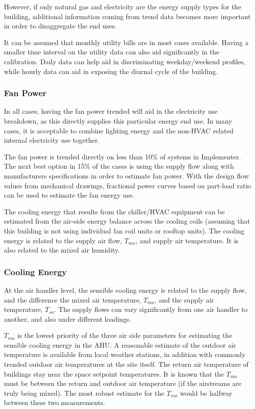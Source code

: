 However, if only natural gas and electricity are the energy supply types for the building, additional information coming from trend data becomes more important in order to disaggregate the end uses. 

It can be assumed that monthly utility bills are in most cases available. Having a smaller time interval on the utility data can also aid significantly in the calibration. Daily data can help aid in discriminating weekday/weekend profiles, while hourly data can aid in exposing the diurnal cycle of the building. 

\subsubsection{Fan Power}

In all cases, having the fan power trended will aid in the electricity use breakdown, as this directly supplies this particular energy end use. In many cases, it is acceptable to combine lighting energy and the non-HVAC related internal electricity use together. 

The fan power is trended directly on less than 10\% of systems in Implementer. The next best option in 15\% of the cases is using the supply flow along with manufacturers specifications in order to estimate fan power. With the design flow values from mechanical drawings, fractional power curves based on part-load ratio can be used to estimate the fan energy use. 

The cooling energy that results from the chiller/HVAC equipment can be estimated from the air-side energy balance across the cooling coils (assuming that this building is not using individual fan coil units or rooftop units). The cooling energy is related to the supply air flow, \(T_{ma}\), and supply air temperature. It is also related to the mixed air humidity. 


\subsubsection{Cooling Energy}
At the air handler level, the sensible cooling energy is related to the supply flow, and the difference the mixed air temperature, \(T_{ma}\), and the supply air temperature, \(T_{sa}\). The supply flows can vary significantly from one air handler to another, and also under different loadings. 

\(T_{ma}\) is the lowest priority of the three air side parameters for estimating the sensible cooling energy in the AHU. A reasonable estimate of the outdoor air temperature is available from local weather stations, in addition with commonly trended outdoor air temperatures at the site itself. The return air temperature of buildings stay near the space setpoint temperatures. It is known that the \(T_{ma}\) must be between the return and outdoor air temperature (if the airstreams are truly being mixed). The most robust estimate for the \(T_{ma}\) would be halfway between these two measurements. 

